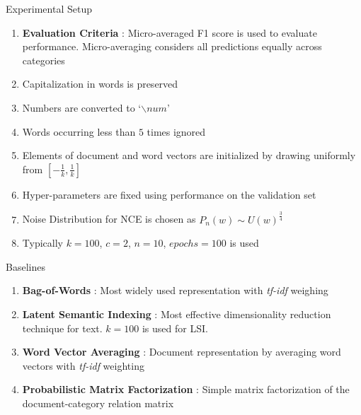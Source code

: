 \documentclass[10pt]{beamer}
\begin{document}
\begin{frame}{Experimental Setup}
\begin{enumerate}
	\vfill\item<1-> \textbf{Evaluation Criteria} : Micro-averaged F1 score is used to evaluate performance. Micro-averaging considers all predictions equally across categories
	\vfill\item<2-> Capitalization in words is preserved
	\vfill\item<3-> Numbers are converted to `$\backslash num$'
	\vfill\item<4-> Words occurring less than $5$ times ignored
	\vfill\item<5-> Elements of document and word vectors are initialized by drawing uniformly from $[-\frac{1}{k}, \frac{1}{k}]$ 
	\vfill\item<6-> Hyper-parameters are fixed using performance on the validation set
	\vfill\item<7-> Noise Distribution for NCE is chosen as $P_{n}(w) \sim U(w)^{\frac{3}{4}}$
	\vfill\item<8-> Typically $k=100$, $c=2$, $n=10$, $epochs=100$ is used
\end{enumerate}
\end{frame}

\begin{frame}{Baselines}
\begin{enumerate}
	\vfill\item<1-> \textbf{Bag-of-Words} : Most widely used representation with \emph{tf-idf} weighing
	\vfill\item<1-> \textbf{Latent Semantic Indexing} : Most effective dimensionality reduction technique for text. $k=100$ is used for LSI.
	\vfill\item<1-> \textbf{Word Vector Averaging} : Document representation by averaging word vectors with \emph{tf-idf} weighting
	\vfill\item<1-> \textbf{Probabilistic Matrix Factorization} : Simple matrix factorization of the document-category relation matrix
\end{enumerate}
\end{frame}
\end{document}
